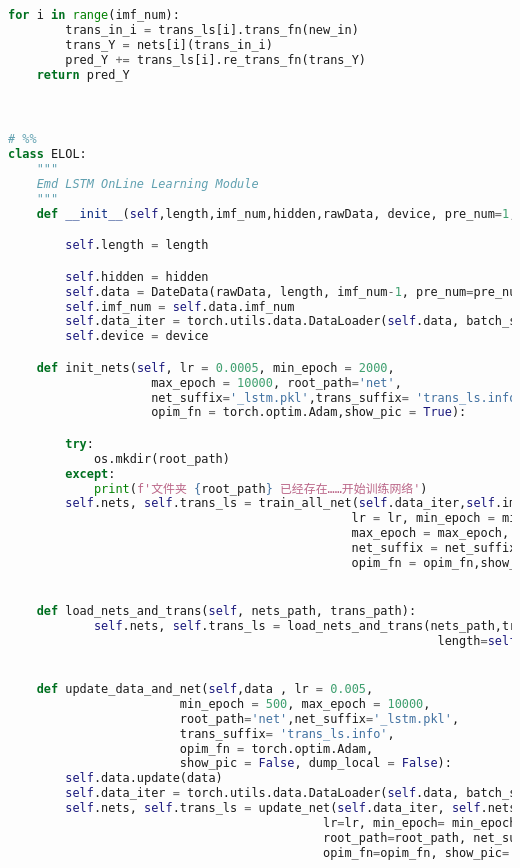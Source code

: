 \begin{appendices}
\begin{lstlisting}[language=python]
    for i in range(imf_num):
        trans_in_i = trans_ls[i].trans_fn(new_in)
        trans_Y = nets[i](trans_in_i)
        pred_Y += trans_ls[i].re_trans_fn(trans_Y)
    return pred_Y



# %%
class ELOL:
    """
    Emd LSTM OnLine Learning Module
    """
    def __init__(self,length,imf_num,hidden,rawData, device, pre_num=1, dataSetWindows=1000):

        self.length = length

        self.hidden = hidden
        self.data = DateData(rawData, length, imf_num-1, pre_num=pre_num, dataSetWindows = dataSetWindows)
        self.imf_num = self.data.imf_num
        self.data_iter = torch.utils.data.DataLoader(self.data, batch_size = 1)
        self.device = device

    def init_nets(self, lr = 0.0005, min_epoch = 2000,
                    max_epoch = 10000, root_path='net',
                    net_suffix='_lstm.pkl',trans_suffix= 'trans_ls.info',
                    opim_fn = torch.optim.Adam,show_pic = True):

        try:
            os.mkdir(root_path)
        except:
            print(f'文件夹 {root_path} 已经存在……开始训练网络')
        self.nets, self.trans_ls = train_all_net(self.data_iter,self.imf_num + 1, self.device,
                                                lr = lr, min_epoch = min_epoch,
                                                max_epoch = max_epoch, root_path = root_path,
                                                net_suffix = net_suffix,trans_suffix= trans_suffix,
                                                opim_fn = opim_fn,show_pic = show_pic, length=self.length, hidden = self.hidden)


    def load_nets_and_trans(self, nets_path, trans_path):
            self.nets, self.trans_ls = load_nets_and_trans(nets_path,trans_path,
                                                            length=self.length, hidden= self.hidden)


    def update_data_and_net(self,data , lr = 0.005,
                        min_epoch = 500, max_epoch = 10000,
                        root_path='net',net_suffix='_lstm.pkl',
                        trans_suffix= 'trans_ls.info',
                        opim_fn = torch.optim.Adam,
                        show_pic = False, dump_local = False):
        self.data.update(data)
        self.data_iter = torch.utils.data.DataLoader(self.data, batch_size = 1)
        self.nets, self.trans_ls = update_net(self.data_iter, self.nets, self.imf_num+1, self.device,
                                            lr=lr, min_epoch= min_epoch, max_epoch=max_epoch,
                                            root_path=root_path, net_suffix=net_suffix, trans_suffix= trans_suffix,
                                            opim_fn=opim_fn, show_pic= show_pic, dump_local=dump_local,length=self.length, hidden=self.hidden)



\end{lstlisting}
\end{appendices}
